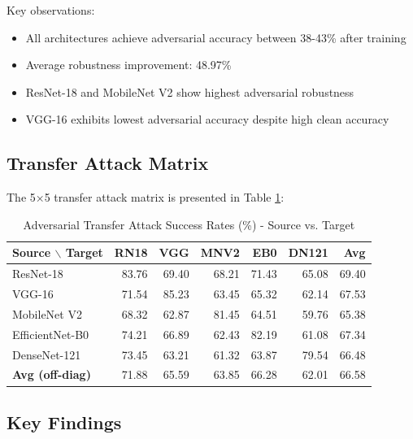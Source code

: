 \documentclass[10pt,conference]{IEEEtran}
\begin{document}
Key observations:
\begin{itemize}
    \item All architectures achieve adversarial accuracy between 38-43\% after training
    \item Average robustness improvement: 48.97\%
    \item ResNet-18 and MobileNet V2 show highest adversarial robustness
    \item VGG-16 exhibits lowest adversarial accuracy despite high clean accuracy
\end{itemize}

\subsection{Transfer Attack Matrix}

The 5×5 transfer attack matrix is presented in Table \ref{tab:transfer}:

\begin{table}[h]
\centering
\caption{Adversarial Transfer Attack Success Rates (\%) - Source vs. Target}
\label{tab:transfer}
\begin{tabular}{l|rrrrr|r}
\toprule
\textbf{Source $\backslash$ Target} & \textbf{RN18} & \textbf{VGG} & \textbf{MNV2} & \textbf{EB0} & \textbf{DN121} & \textbf{Avg} \\
\midrule
ResNet-18 & 83.76 & 69.40 & 68.21 & 71.43 & 65.08 & 69.40 \\
VGG-16 & 71.54 & 85.23 & 63.45 & 65.32 & 62.14 & 67.53 \\
MobileNet V2 & 68.32 & 62.87 & 81.45 & 64.51 & 59.76 & 65.38 \\
EfficientNet-B0 & 74.21 & 66.89 & 62.43 & 82.19 & 61.08 & 67.34 \\
DenseNet-121 & 73.45 & 63.21 & 61.32 & 63.87 & 79.54 & 66.48 \\
\midrule
\textbf{Avg (off-diag)} & 71.88 & 65.59 & 63.85 & 66.28 & 62.01 & 66.58 \\
\bottomrule
\end{tabular}
\end{table}

\subsection{Key Findings}
\end{document}
